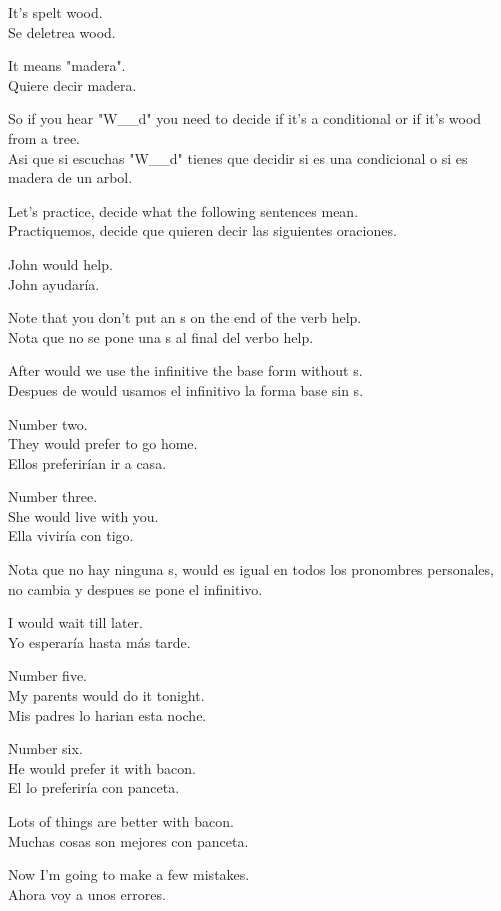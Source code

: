 It's spelt wood.\\
Se deletrea wood.

It means "madera".\\
Quiere decir madera.

So if you hear "W\_\_d" you need to decide if it's a conditional or if it's
wood from a tree.\\
Asi que si escuchas "W\_\_d" tienes que decidir si es una condicional o si
es madera de un arbol.

Let's practice, decide what the following sentences mean.\\
Practiquemos, decide que quieren decir las siguientes oraciones.

John would help.\\
John ayudaría.

Note that you don't put an s on the end of the verb help.\\
Nota que no se pone una s al final del verbo help.

After would we use the infinitive the base form without s.\\
Despues de would usamos el infinitivo la forma base sin s.

Number two.\\
They would prefer to go home.\\
Ellos preferirían ir a casa.

Number three.\\
She would live with you.\\
Ella viviría con tigo.

Nota que no hay ninguna s, would es igual en todos los pronombres personales,
no cambia y despues se pone el infinitivo.

I would wait till later.\\
Yo esperaría hasta más tarde.

Number five.\\
My parents would do it tonight.\\
Mis padres lo harian esta noche.

Number six.\\
He would prefer it with bacon.\\
El lo preferiría con panceta.

Lots of things are better with bacon.\\
Muchas cosas son mejores con panceta.

Now I'm going to make a few mistakes.\\
Ahora voy a unos errores.


